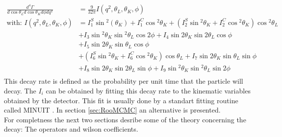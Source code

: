 \documentclass[english]{uzhpub}
\begin{document}
\begin{equation}
 \begin{split}
  \frac{d^4 \Gamma}{d \cos{ \theta_L} d \cos{\theta_K} d \phi d q^2} &= \frac{9}{32 \pi} I(q^2,\theta_L, \theta_K, \phi) \\
  \text{with: } I(q^2,\theta_L, \theta_K, \phi) &= I_1^S \sin{^2(\theta_K)} + I_1^C \cos{^2 \theta_K} + \left(I_2^S \sin{^2 \theta_K} + I_2^C \cos{^2 \theta_K} \right) \cos{^2\theta_L} \\
  &+ I_3 \sin{^2 \theta_K} \sin{^2 \theta_L} \cos{2\phi} + I_4 \sin{2\theta_K} \sin{2\theta_L} \cos{\phi} \\
  &+ I_5 \sin{2\theta_K} \sin{ \theta_L} \cos{ \phi} \\
  &+ \left(I_6^S \sin{^2 \theta_K} + I_6^C \cos{^2 \theta_K}  \right) \cos{ \theta_L} + I_7 \sin{ 2\theta_K} \sin{\theta_L} \sin{\phi} \\
  &+ I_8 \sin{ 2\theta_K} \sin{ 2\theta_L} \sin{ \phi} + I_9 \sin{^2 \theta_K} \sin{^2 \theta_L} \sin{2 \phi}\\
 \end{split}
 \label{eq:diff_decay_rate}
\end{equation}
This decay rate is defined as the probability per unit time that the particle will decay. The $I_i$ can be obtained by fitting this decay rate to the kinematic variables obtained by the detector. This fit is usually done by a standart fitting routine called MINUIT \cite{bib:Minuit}. In section \ref{sec:RooMCMC} an alternative is presented. \\
For completness the next two sections desribe some of the theory concerning the decay: The operators and wilson coefficients.
\end{document}

